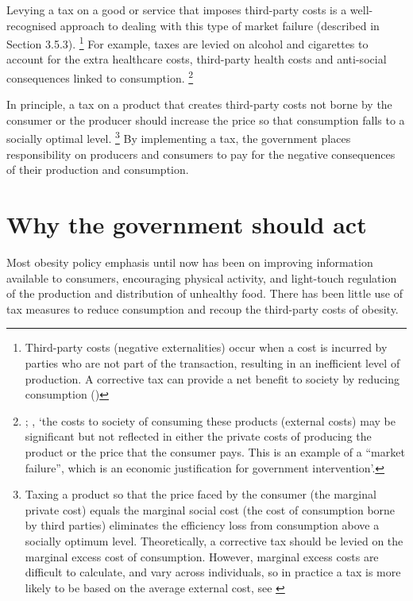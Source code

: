 \documentclass[embargoed]{grattan}
\begin{document}
Levying a tax on a good or service that imposes third-party costs is a well-recognised approach to dealing with this type of market failure (described in Section 3.5.3).%
\footnote{Third-party costs (negative externalities) occur when a cost is incurred by parties who are not part of the transaction, resulting in an inefficient level of production.
A corrective tax can provide a net benefit to society by reducing consumption (\textcites{Freebairn2010Taxationobesity}{Greenwald1986Externalitieseconomiesimperfect})} For example, taxes are levied on alcohol and cigarettes to account for the extra healthcare costs, third-party health costs and anti-social consequences linked to consumption.%
\footnote{\textcite{Bahl2003uneasycasediscriminatory}; \textcite{Organisation2015Usingpricepolicies}, `the costs to society of consuming these products (external costs) may be significant but not reflected in either the private costs of producing the product or the price that the consumer pays.
This is an example of a ``market failure'', which is an economic justification for government intervention'.}

In principle, a tax on a product that creates third-party costs not borne by the consumer or the producer should increase the price so that consumption falls to a socially optimal level.%
\footnote{Taxing a product so that the price faced by the consumer (the marginal private cost) equals the marginal social cost (the cost of consumption borne by third parties) eliminates the efficiency loss from consumption above a socially optimum level.
Theoretically, a corrective tax should be levied on the marginal excess cost of consumption.
However, marginal excess costs are difficult to calculate, and vary across individuals, so in practice a tax is more likely to be based on the average external cost, see \textcite{CnossenExcisetaxationAustralia}} By implementing a tax, the government places responsibility on producers and consumers to pay for the negative consequences of their production and consumption.

\section{Why the government should act}\label{why-the-government-should-act}

Most obesity policy emphasis until now has been on improving information available to consumers, encouraging physical activity, and light-touch regulation of the production and distribution of unhealthy food.
There has been little use of tax measures to reduce consumption and recoup the third-party costs of obesity.
\end{document}
